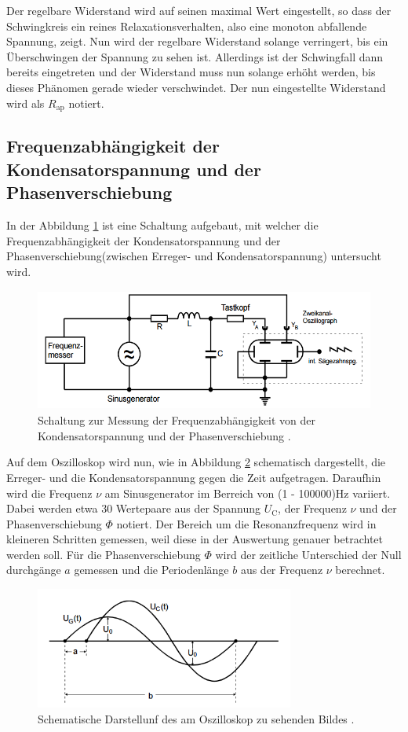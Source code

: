 Der regelbare Widerstand wird auf seinen maximal Wert eingestellt, so dass der Schwingkreis ein reines Relaxationsverhalten, also eine monoton abfallende Spannung, zeigt. Nun wird der regelbare Widerstand solange verringert, bis ein Überschwingen der Spannung zu sehen ist. Allerdings ist der Schwingfall dann bereits eingetreten und der Widerstand muss nun solange erhöht werden, bis dieses Phänomen gerade wieder verschwindet. Der nun eingestellte Widerstand wird als $R_\text{ap}$ notiert.

\subsection{Frequenzabhängigkeit der Kondensatorspannung und der Phasenverschiebung}
In der Abbildung \ref{fig:Durch3} ist eine Schaltung aufgebaut, mit welcher die Frequenzabhängigkeit der Kondensatorspannung und der Phasenverschiebung(zwischen Erreger- und Kondensatorspannung) untersucht wird.

\begin{figure}
  \centering
  \includegraphics[height=4cm]{picture/Durch3.PNG}
  \caption{Schaltung zur Messung der Frequenzabhängigkeit von der Kondensatorspannung und der Phasenverschiebung \cite[296]{sample}.}
  \label{fig:Durch3}
\end{figure}

Auf dem Oszilloskop wird nun, wie in Abbildung \ref{fig:Durch4} schematisch dargestellt, die Erreger- und die Kondensatorspannung gegen die Zeit aufgetragen. Daraufhin wird die Frequenz $\nu$ am Sinusgenerator im Berreich von (1 - 100000)Hz variiert. Dabei werden etwa 30 Wertepaare aus der Spannung $U_\text{C}$, der Frequenz $\nu$ und der Phasenverschiebung $\Phi$ notiert. Der Bereich um die Resonanzfrequenz wird in kleineren Schritten gemessen, weil diese in der Auswertung genauer betrachtet werden soll. Für die Phasenverschiebung $\Phi$ wird der zeitliche Unterschied der Null durchgänge $a$ gemessen und die Periodenlänge $b$ aus der Frequenz $\nu$ berechnet.   

\begin{figure}
  \centering
  \includegraphics[height=4cm]{picture/Durch4.PNG}
  \caption{Schematische Darstellunf des am Oszilloskop zu sehenden Bildes \cite[282]{samples}.}
  \label{fig:Durch4}
\end{figure}
